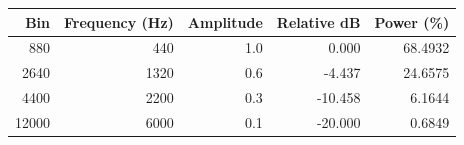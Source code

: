 \begin{tabular}{rrrrr}
\toprule
Bin & Frequency (Hz) & Amplitude & Relative dB & Power (\%) \\
\midrule
880 & 440 & 1.0 & 0.000 & 68.4932 \\
2640 & 1320 & 0.6 & -4.437 & 24.6575 \\
4400 & 2200 & 0.3 & -10.458 & 6.1644 \\
12000 & 6000 & 0.1 & -20.000 & 0.6849 \\
\bottomrule
\end{tabular}
